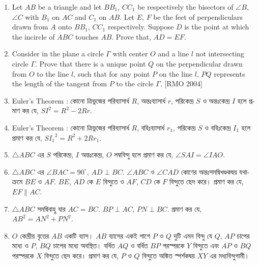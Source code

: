 \documentclass[11pt, a4paper]{article}
\begin{document}
\begin{enumerate}
	\item Let $AB$ be a triangle and let $BB_1$, $CC_1$ be respectively the bisectors of $\angle B$, $\angle C$ with $B_1$ on $AC$ and $C_1$ on $AB$. Let $E$, $F$ be the feet of perpendiculars drawn from $A$ onto $BB_1$, $CC_1$ respectively. Suppose $D$ is the point at which the incircle of $ABC$ touches $AB$. Prove that, $AD = EF$.
	
	\item Consider in the plane a circle $\Gamma$ with center $O$ and a line $l$ not intersecting circle $\Gamma$. Prove that there is a unique point $Q$ on the perpendicular drawn from $O$ to the line $l$, such that for any point $P$ on the line $l$, $PQ$ represents the length of the tangent from $P$ to the circle $\Gamma$. [RMO 2004]
	
	\item Euler's Theorem : \textbengali{কোনো ত্রিভুজের পরিব্যাসার্ধ} $R$, \textbengali{অন্তঃব্যাসার্ধ} $r$, \textbengali{পরিকেন্দ্র} $S$ \textbengali{ও অন্তঃকেন্দ্র} $I$ \textbengali{হলে প্রমাণ কর যে, } $SI^2 = R^2 - 2Rr$.
	
	\item Euler's Theorem : \textbengali{কোনো ত্রিভুজের পরিব্যাসার্ধ} $R$, \textbengali{বহিঃব্যাসার্ধ} $r_1$, \textbengali{পরিকেন্দ্র} $S$ \textbengali{ও বহিঃকেন্দ্র} $I_1$ \textbengali{হলে প্রমাণ কর যে, } $S{I_1}^2 = R^2 + 2Rr_1$.
	
	\item $\bigtriangleup ABC$ \textbengali{এর} $S$ \textbengali{পরিকেন্দ্র,} $I$ \textbengali{অন্তঃকেন্দ্র,} $O$ \textbengali{লম্ববিন্দু হলে প্রমাণ কর যে,} $\angle SAI = \angle IAO.$
	
	\item $\bigtriangleup ABC$ \textbengali{এর} $\angle BAC = 90^{\circ}$, $AD \perp BC$. $\angle ABC$ \textbengali{ও} $\angle CAD$ \textbengali{কোণের  অন্তঃসমদ্বিখণ্ডকদ্বয় যথাক্রমে} $BE$ \textbengali{ও} $AF$. $BE$, $AD$ \textbengali{কে} $E$ \textbengali{বিন্দুতে ও} $AF$, $CD$ \textbengali{কে} $F$ \textbengali{বিন্দুতে ছেদ করে। প্রমাণ কর যে,} $EF \parallel AC.$
	
	\item $\bigtriangleup ABC$ \textbengali{সমদ্বিবাহু যার} $AC=BC$. $BP \perp AC$, $PN \perp BC$. \textbengali{প্রমাণ কর যে,} $AB^2 = AN^2 + PN^2$.
	
	\item $O$ \textbengali{কেন্দ্রীয় বৃত্তের} $AB$ \textbengali{একটি ব্যাস।} $AB$ \textbengali{ব্যাসের একই পাশে} $P$ \textbengali{ও} $Q$ \textbengali{দুটি এমন বিন্দু যে} $Q$, $AP$ \textbengali{চাপের মধ্যে ও} $P$, $BQ$ \textbengali{চাপের মধ্যে অবস্থিত। বর্ধিত} $AQ$ \textbengali{ও বর্ধিত} $BP$ \textbengali{পরস্পরকে} $Y$ \textbengali{বিন্দুতে এবং} $AP$ \textbengali{ও} $BQ$ \textbengali{পরস্পরকে} $X$ \textbengali{বিন্দুতে ছেদ করে। প্রমাণ কর যে,} $P$ \textbengali{ও} $Q$ \textbengali{বিন্দুতে অঙ্কিত স্পর্শকদ্বয়} $XY$ \textbengali{এর মধ্যবিন্দুগামী।}
	

\end{enumerate}
\end{document}
